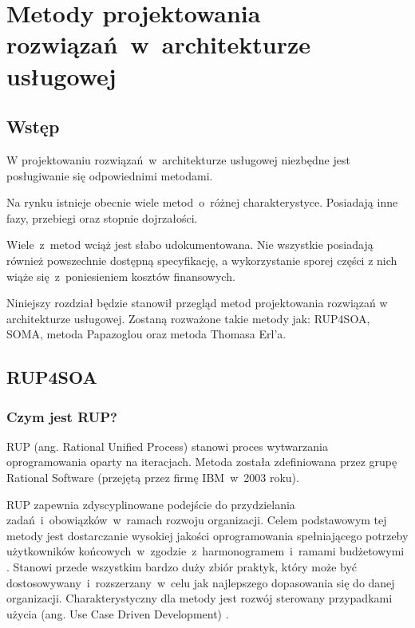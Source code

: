 \chapter{Metody projektowania rozwiązań~w~architekturze usługowej}

\section{Wstęp}
W projektowaniu rozwiązań~w~architekturze usługowej niezbędne jest posługiwanie się odpowiednimi metodami. 

Na rynku istnieje obecnie wiele metod~o~różnej charakterystyce. Posiadają inne fazy, przebiegi oraz stopnie dojrzałości. 

Wiele~z~metod wciąż jest słabo udokumentowana. Nie wszystkie posiadają również powszechnie dostępną specyfikację, a wykorzystanie sporej części z nich wiąże się~z~poniesieniem kosztów finansowych.

Niniejszy rozdział będzie stanowił przegląd metod projektowania rozwiązań w architekturze usługowej. Zostaną rozważone takie metody jak: RUP4SOA, SOMA, metoda Papazoglou oraz metoda Thomasa Erl'a. 

\section{RUP4SOA}
\subsection{Czym jest RUP?}
RUP (ang. Rational Unified Process) stanowi proces  wytwarzania oprogramowania oparty na iteracjach. Metoda została zdefiniowana przez grupę Rational Software (przejętą przez firmę IBM~w~2003 roku). 

RUP zapewnia zdyscyplinowane podejście do przydzielania zadań~i~obowiązków~w~ramach rozwoju organizacji. Celem podstawowym tej metody jest dostarczanie wysokiej jakości oprogramowania spełniającego potrzeby użytkowników końcowych~w~zgodzie~z~harmonogramem~i~ramami budżetowymi \cite{RUPIntRat}. Stanowi przede wszystkim bardzo duży zbiór praktyk, który może być dostosowywany~i~rozszerzany~w~celu jak najlepszego dopasowania się do danej organizacji. Charakterystyczny dla metody jest rozwój sterowany przypadkami użycia (ang. Use Case Driven Development) \cite{RUPMartFow}. 

